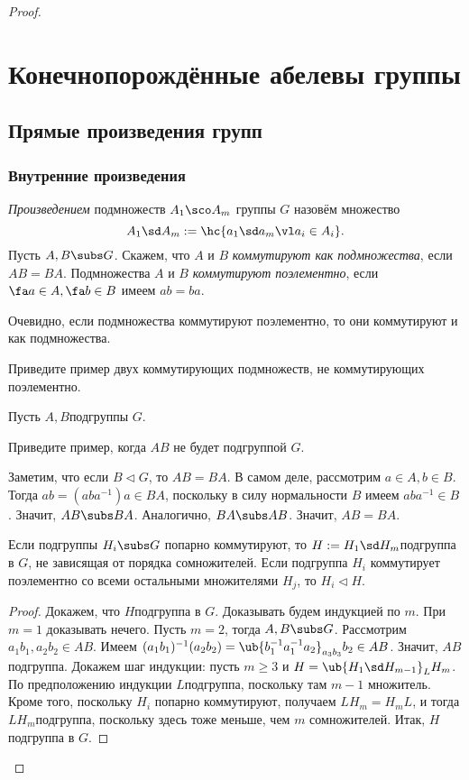 \documentclass[a4paper]{article}
\begin{document}
\begin{proof}
\section{Конечнопорождённые абелевы группы}

\subsection{Прямые произведения групп}

\subsubsection{Внутренние произведения}

\begin{df}
\emph{Произведением} подмножеств $A_1\sco A_m$ группы $G$ назовём множество
$$A_1\sd A_m := \hc{a_1\sd a_m \vl a_i \in A_i}.$$
Пусть $A,B \subs G$. Скажем, что $A$ и $B$ \emph{коммутируют как подмножества}, если $AB=BA$.
Подмножества $A$ и $B$ \emph{коммутируют поэлементно},
если $\fa a \in A, \fa b \in B$ имеем $ab=ba$.
\end{df}

Очевидно, если подмножества коммутируют поэлементно, то они коммутируют и как подмножества.

\begin{problem}
Приведите пример двух коммутирующих подмножеств, не коммутирующих поэлементно.
\end{problem}

Пусть $A, B$\т подгруппы $G$.

\begin{problem}
Приведите пример, когда $AB$ не будет подгруппой $G$.
\end{problem}

Заметим, что если $B \lhd G$, то $AB=BA$. В самом деле, рассмотрим  $a \in A, b \in B$. Тогда $ab=(aba^{-1})a
\in BA$, поскольку в силу нормальности $B$ имеем $aba^{-1} \in B$. Значит, $AB \subs BA$. Аналогично, $BA
\subs AB$. Значит, $AB=BA$.

\begin{theorem}
Если подгруппы $H_i \subs G$ попарно коммутируют, то $H:=H_1\sd H_m$\т подгруппа в $G$, не зависящая от порядка
сомножителей. Если подгруппа $H_i$ коммутирует поэлементно со всеми остальными множителями $H_j$, то $H_i \lhd H$.
\end{theorem}
\begin{proof}
Докажем, что $H$\т подгруппа в $G$. Доказывать будем индукцией по $m$.  При $m=1$ доказывать нечего. Пусть
$m=2$, тогда $A, B \subs G$. Рассмотрим $a_1b_1, a_2b_2 \in AB$. Имеем
$(a_1b_1)^{-1}(a_2b_2)=\ub{b_1^{-1}a_1^{-1}a_2}_{a_3b_3}b_2 \in AB$. Значит, $AB$\т подгруппа. Докажем шаг
индукции: пусть $m \ge 3$ и $H=\ub{H_1\sd H_{m-1}}_L H_m$. По предположению индукции $L$\т подгруппа,
поскольку там $m-1$ множитель. Кроме того, поскольку $H_i$ попарно коммутируют, получаем $LH_m=H_mL$, и тогда
$LH_m$\т подгруппа, поскольку здесь тоже меньше, чем $m$ сомножителей. Итак, $H$\т подгруппа в $G$.


\end{proof}
\end{proof}
\end{document}
